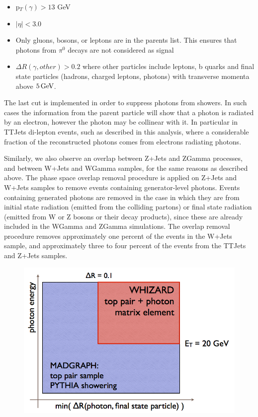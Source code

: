 \begin{itemize}
	\item p$_T(\gamma) > 13$ GeV
	\item $|\eta| < 3.0$
	\item Only gluons, bosons, or leptons are in the parents list. This ensures that photons from $\pi^0$ decays are not considered as signal
	\item $\Delta R(\gamma, other) > 0.2$ where other particles include leptons, b quarks and final state particles (hadrons, charged leptons, photons) with transverse momenta above $5 \,\text{Ge\hspace{-.08em}V}$.
\end{itemize}

The last cut is implemented in order to suppress photons from showers. In such cases the information from the parent particle will show that a photon is radiated by an electron, however the photon may be collinear with it. In particular in TTJets di-lepton events, such as described in this analysis, where a considerable fraction of the reconstructed photons comes from electrons radiating photons.

 Similarly, we also observe an overlap between Z+Jets and ZGamma processes, and between W+Jets and WGamma samples, for the same reasons as described above. The phase space overlap removal procedure is applied on Z+Jets and W+Jets samples to remove events containing generator-level photons. Events containing generated photons are removed in the case in which they are from initial state radiation (emitted from the colliding partons) or final state radiation (emitted from W or Z bosons or their decay products), since these are already included in the WGamma and ZGamma simulations. The overlap removal procedure removes approximately one percent of the events in the W+Jets sample, and approximately three to four percent of the events from the TTJets and Z+Jets samples.

\begin{figure} 
\begin{center}
\includegraphics[scale=0.5]{Figures/photonphasespace.png}
\end{center}
\caption{}
\label{fig-photonphasespace}
\end{figure}

